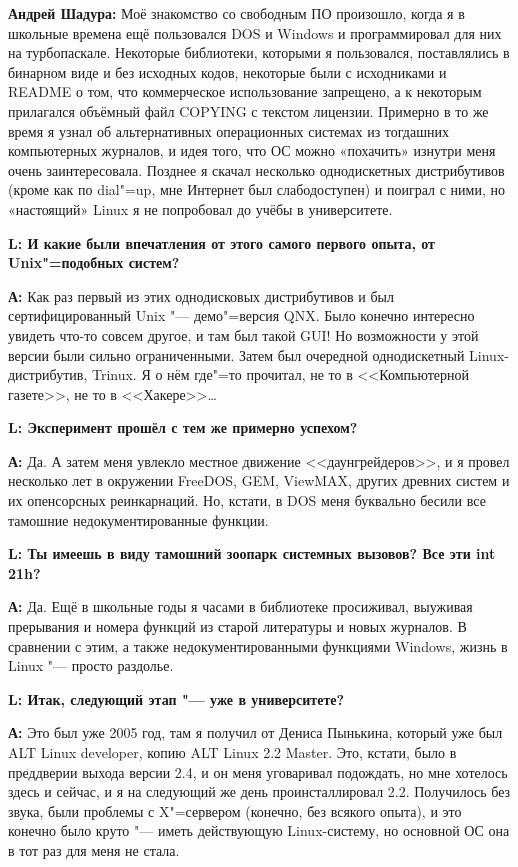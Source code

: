 \documentclass[10pt, a5paper]{article}
\begin{document}

{\noindent \bf Андрей Шадура:} Моё знакомство со свободным ПО произошло, когда я в школьные времена ещё пользовался DOS и Windows и программировал для них на турбопаскале. Некоторые библиотеки, которыми я пользовался, поставлялись в бинарном виде и без исходных кодов, некоторые были с исходниками и README о том, что коммерческое использование запрещено, а к некоторым прилагался объёмный файл COPYING с текстом лицензии. Примерно в то же время я узнал об альтернативных операционных системах из тогдашних компьютерных журналов, и идея того, что ОС можно «похачить» изнутри меня очень заинтересовала. Позднее я скачал несколько однодискетных дистрибутивов (кроме как по dial"=up, мне Интернет был слабодоступен) и поиграл с ними, но «настоящий» Linux я не попробовал до учёбы в университете.

{\noindent \bf L: И какие были впечатления от этого самого первого опыта, от Unix"=подобных систем?}

{\noindent \bf А:} Как раз первый из этих однодисковых дистрибутивов и был сертифицированный Unix "--- демо"=версия QNX. Было конечно интересно увидеть что-то совсем другое, и там был такой GUI! Но возможности у этой версии были сильно ограниченными. Затем был очередной однодискетный Linux-дистрибутив, Trinux. Я о нём где"=то прочитал, не то в <<Компьютерной газете>>, не то в <<Хакере>>\ldots

{\noindent \bf L: Эксперимент прошёл с тем же примерно успехом?}

{\noindent \bf А:} Да. А затем меня увлекло местное движение <<даунгрейдеров>>, и я провел несколько лет в окружении FreeDOS, GEM, ViewMAX, других древних систем и их опенсорсных реинкарнаций. Но, кстати, в DOS меня буквально бесили все тамошние недокументированные функции.

{\noindent \bf L: Ты имеешь в виду тамошний зоопарк системных вызовов? Все эти int 21h?}

{\noindent \bf А:} Да. Ещё в школьные годы я часами в библиотеке просиживал, выуживая прерывания и номера функций из старой литературы и новых журналов. В сравнении с этим, а также недокументированными функциями Windows, жизнь в Linux "--- просто раздолье.

{\noindent \bf L: Итак, следующий этап "--- уже в университете?}

{\noindent \bf А:} Это был уже  2005 год, там я получил от Дениса Пынькина, который уже был ALT Linux developer, копию ALT Linux 2.2 Master. Это, кстати, было в преддверии выхода версии 2.4, и он меня уговаривал подождать, но мне хотелось здесь и сейчас, и я на следующий же день проинсталлировал 2.2. Получилось без звука, были проблемы с X"=сервером (конечно, без всякого опыта), и это конечно было круто "--- иметь действующую Linux-систему, но основной ОС она в тот раз для меня не стала.
\end{document}
